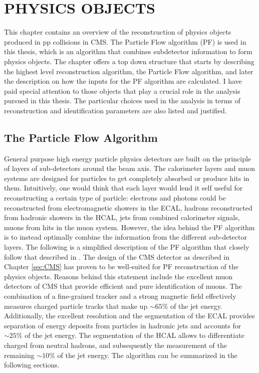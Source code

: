 \chapter{PHYSICS OBJECTS}\label{sec:objects}
\noindent\justify
This chapter contains an overview of the reconstruction of physics objects produced in pp collisions in CMS. 
The Particle Flow algorithm (PF) is used in this thesis, which is an algorithm that combines subdetector information to form physics objects. 
\newpara
\noindent\justify
The chapter offers a top down structure that starts by describing the highest level reconstruction algorithm, the Particle Flow algorithm, and later the description on how the inputs for the PF algorithm are calculated. 
I have paid special attention to those objects that play a crucial role in the analysis pursued in this thesis. 
The particular choices used in the analysis in terms of reconstruction and identification parameters are also listed and justified.
\newpage
\section{The Particle Flow Algorithm}\label{sec:PF}
\noindent\justify
General purpose high energy particle physics detectors are built on the principle of layers of sub-detectors around the beam axis. 
The calorimeter layers and muon systems are designed for particles to get completely absorbed or produce hits in them. 
Intuitively, one would think that each layer would lend it self useful for reconstructing a certain type of particle: electrons and photons could be reconstructed from electromagnetic showers in the ECAL, hadrons reconstructed from hadronic showers in the HCAL, jets from combined calorimeter signals, muons from hits in the muon system. 
However, the idea behind the PF algorithm is to instead optimally combine the information from the different sub-detector layers.   
The following is a simplified description of the PF algorithm that closely follow that described in \cite{Sirunyan:2017ulk}.
The design of the CMS detector as described in Chapter \ref{sec:CMS} has proven to be well-suited for PF reconstruction of the physics objects. 
Reasons behind this statement include the excellent muon detectors of CMS that provide efficient and pure identification of muons. 
The combination of a fine-grained tracker and a strong magnetic field effectively measures charged particle tracks that make up $\sim65\%$ of the jet energy. 
Additionally, the excellent resolution and the segmentation of the ECAL provides separation of energy deposits from particles in hadronic jets and accounts for $\sim25\%$ of the jet energy. 
The segmentation of the HCAL allows to differentiate charged from neutral hadrons, and subsequently the measurement of the remaining $\sim10\%$ of the jet energy. 
The algorithm can be summarized in the following sections.
